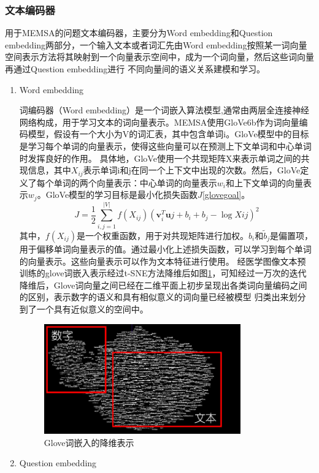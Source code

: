 \subsubsection*{文本编码器}
用于MEMSA的问题文本编码器，主要分为Word embedding和Question embedding两部分，一个输入文本或者词汇先由Word embedding按照某一词向量空间表示方法将其映射到一个向量表示空间中，成为一个词向量，然后这些词向量再通过Question embedding进行
不同向量间的语义关系建模和学习。
\begin{enumerate}[topsep = 0 pt, itemsep= 0 pt, parsep=0pt, partopsep=0pt, leftmargin=44pt, itemindent=0pt, labelsep=6pt, label=(\arabic*)]
	\item Word embedding
	
	词编码器（Word embedding）是一个词嵌入算法模型,通常由两层全连接神经网络构成，用于学习文本的词向量表示。MEMSA使用GloVe6b作为词向量编码模型，假设有一个大小为V的词汇表，其中包含单词i。GloVe模型中的目标是学习每个单词的向量表示，使得这些向量可以在预测上下文单词和中心单词时发挥良好的作用。
	具体地，GloVe使用一个共现矩阵X来表示单词之间的共现信息，其中$X_{ij}$表示单词i和j在同一个上下文中出现的次数。然后，GloVe定义了每个单词的两个向量表示：中心单词的向量表示$w_i$和上下文单词的向量表示$w_j$。GloVe模型的学习目标是最小化损失函数$J$\eqref{glovegoal}。
	\begin{equation}
		\label{glovegoal}
		J = \frac{1}{2} \sum_{i,j=1}^{|V|} f(X_{ij})(\mathbf{v}_i^T\mathbf{u}j + b_i + b_j - \log X{ij})^2
	\end{equation}
	其中，$f(X_{ij})$是一个权重函数，用于对共现矩阵进行加权。$b_i$和$\tilde{b}_j$是偏置项，用于偏移单词向量表示的值。通过最小化上述损失函数，可以学习到每个单词的向量表示。这些向量表示可以作为文本特征进行使用。
	经医学图像文本预训练的glove词嵌入表示经过t-SNE方法降维后如图\ref{fig:Glove}，可知经过一万次的迭代降维后，Glove词向量之间已经在二维平面上初步呈现出各类词向量编码之间的区别，表示数字的语义和具有相似意义的词向量已经被模型
	归类出来划分到了一个具有近似意义的空间中。
	\begin{figure}[htbp]
		\centering	
		\includegraphics[width=0.8\textwidth]{Fig/myfig/chapter3/glove.png}  %
		\caption{\label{fig:Glove}Glove词嵌入的降维表示} 
	\end{figure}
	\item Question embedding
	

\end{enumerate}
